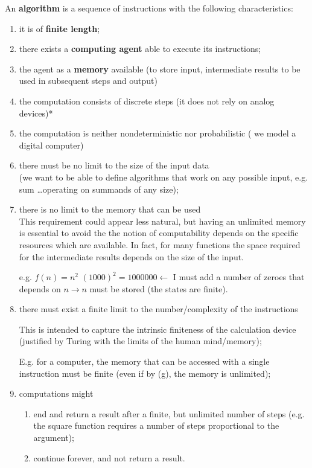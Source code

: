 \documentclass{amsbook}
\theoremstyle{definition}
\theoremstyle{remark}
\numberwithin{section}{chapter}
\numberwithin{equation}{chapter}
\begin{document}
An \textbf{algorithm} is a sequence of instructions with the following characteristics:
\begin{enumerate}[label=\alph*)]
\item
  \label{as:prog_fin}
  it is of \textbf{finite length};
\item there exists a \textbf{computing agent} able to execute its instructions;
\item the agent as a \textbf{memory} available (to store input, intermediate results to be used in subsequent steps and output)
\item the computation consists of discrete steps (it does not rely on analog devices)*
\item the computation is neither nondeterministic nor probabilistic (
  we model a  digital computer)
  
\item there must be no limit to the size of the input data\\
  (we want to be able to define algorithms that work on any possible
  input, e.g. sum \dots operating on summands of any size);
  
\item there is no limit to the memory that can be used\\
  This requirement could appear less natural, but having an unlimited
  memory is essential to avoid the the notion of computability depends
  on the specific resources which are available. In fact, for many
  functions the space required for the intermediate results depends on
  the size of the input.
  
  e.g. $f(n) = n^2$ $(1000)^2 = 1000000 \leftarrow$ I must add a
  number of zeroes that depends on $n \rightarrow n$ must be stored
  (the states are finite).

\item
  \label{as:istr_fin}
  there must exist a finite limit to the number/complexity of the
  instructions
  
  This is intended to capture the intrinsic finiteness of the
  calculation device (justified by Turing with the limits of the human
  mind/memory);
  
  E.g. for a computer, the memory that can be accessed with a single
  instruction must be finite (even if by
  (g), the memory is unlimited);
  
\item computations might
  \begin{enumerate}
    
  \item  end and return a result after a finite, but unlimited number of steps  
    (e.g. the square function requires a number of steps proportional to the argument);
    
  \item continue forever, and not return a result.
  \end{enumerate}
\end{enumerate}
\end{document}
